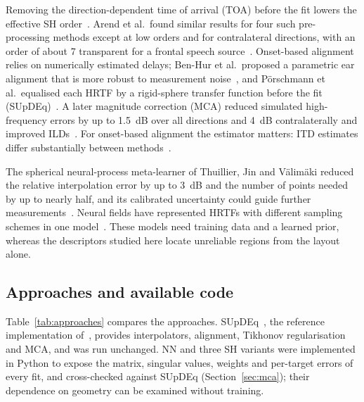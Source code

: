 \documentclass[11pt,a4paper]{article}
\begin{document}
Removing the direction-dependent time of arrival (TOA) before the fit lowers the effective SH order~\cite{evans1998,arend2021}. Arend et al.\ found similar results for four such pre-processing methods except at low orders and for contralateral directions, with an order of about 7 transparent for a frontal speech source~\cite{arend2021}. Onset-based alignment relies on numerically estimated delays; Ben-Hur et al.\ proposed a parametric ear alignment that is more robust to measurement noise~\cite{benhur2019}, and Pörschmann et al.\ equalised each HRTF by a rigid-sphere transfer function before the fit (SUpDEq)~\cite{porschmann2019}. A later magnitude correction (MCA) reduced simulated high-frequency errors by up to 1.5~dB over all directions and 4~dB contralaterally and improved ILDs~\cite{arend2023}. For onset-based alignment the estimator matters: ITD estimates differ substantially between methods~\cite{katz2014}.

The spherical neural-process meta-learner of Thuillier, Jin and Välimäki reduced the relative interpolation error by up to 3~dB and the number of points needed by up to nearly half, and its calibrated uncertainty could guide further measurements~\cite{thuillier2024}. Neural fields have represented HRTFs with different sampling schemes in one model~\cite{zhang2023}. These models need training data and a learned prior, whereas the descriptors studied here locate unreliable regions from the layout alone.

\subsection{Approaches and available code}

Table~\ref{tab:approaches} compares the approaches. SUpDEq~\cite{supdeq}, the reference implementation of~\cite{arend2023}, provides interpolators, alignment, Tikhonov regularisation and MCA, and was run unchanged. NN and three SH variants were implemented in Python to expose the matrix, singular values, weights and per-target errors of every fit, and cross-checked against SUpDEq (Section~\ref{sec:mca}); their dependence on geometry can be examined without training.
\end{document}

